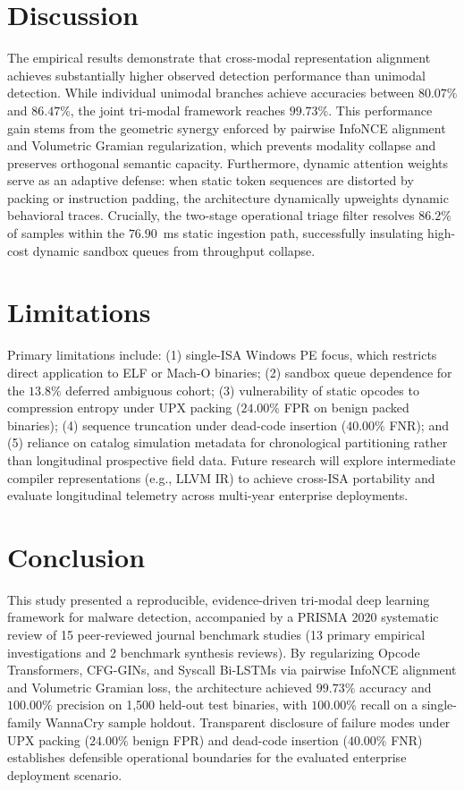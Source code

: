 \documentclass[pdflatex,sn-mathphys-num]{sn-jnl}
\begin{document}
\section{Discussion}\label{sec:discussion}
The empirical results demonstrate that cross-modal representation alignment achieves substantially higher observed detection performance than unimodal detection. While individual unimodal branches achieve accuracies between $80.07\%$ and $86.47\%$, the joint tri-modal framework reaches $99.73\%$. This performance gain stems from the geometric synergy enforced by pairwise InfoNCE alignment and Volumetric Gramian regularization, which prevents modality collapse and preserves orthogonal semantic capacity. Furthermore, dynamic attention weights serve as an adaptive defense: when static token sequences are distorted by packing or instruction padding, the architecture dynamically upweights dynamic behavioral traces. Crucially, the two-stage operational triage filter resolves $86.2\%$ of samples within the $76.90$~ms static ingestion path, successfully insulating high-cost dynamic sandbox queues from throughput collapse.

\section{Limitations}\label{sec:limitations}
Primary limitations include: (1) single-ISA Windows PE focus, which restricts direct application to ELF or Mach-O binaries; (2) sandbox queue dependence for the $13.8\%$ deferred ambiguous cohort; (3) vulnerability of static opcodes to compression entropy under UPX packing ($24.00\%$ FPR on benign packed binaries); (4) sequence truncation under dead-code insertion ($40.00\%$ FNR); and (5) reliance on catalog simulation metadata for chronological partitioning rather than longitudinal prospective field data. Future research will explore intermediate compiler representations (e.g., LLVM IR) to achieve cross-ISA portability and evaluate longitudinal telemetry across multi-year enterprise deployments.

\section{Conclusion}\label{sec:conclusion}
This study presented a reproducible, evidence-driven tri-modal deep learning framework for malware detection, accompanied by a PRISMA 2020 systematic review of 15 peer-reviewed journal benchmark studies (13 primary empirical investigations and 2 benchmark synthesis reviews). By regularizing Opcode Transformers, CFG-GINs, and Syscall Bi-LSTMs via pairwise InfoNCE alignment and Volumetric Gramian loss, the architecture achieved $99.73\%$ accuracy and $100.00\%$ precision on 1,500 held-out test binaries, with $100.00\%$ recall on a single-family WannaCry sample holdout. Transparent disclosure of failure modes under UPX packing ($24.00\%$ benign FPR) and dead-code insertion ($40.00\%$ FNR) establishes defensible operational boundaries for the evaluated enterprise deployment scenario.
\end{document}
